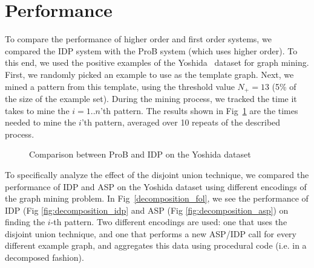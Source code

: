\section{Performance}\label{sec:performance}
To compare the performance of higher order and first order systems, we compared the IDP system with the ProB system (which uses higher order).
To this end, we used the positive examples of the Yoshida~\citep{yoshida_dataset} dataset for graph mining.
First, we randomly picked an example to use as the template graph.
Next, we mined a pattern from this template, using the threshold value $N_{+} = 13$ (5\% of the size of the example set).
During the mining process, we tracked the time it takes to mine the $i=1..n$'th pattern.
The results shown in Fig~\ref{fig:ProBIDPComp} are the times needed to mine the $i$'th pattern, averaged over 10 repeats of the described process.

\begin{figure}
\caption{Comparison between ProB and IDP on the Yoshida dataset\label{fig:ProBIDPComp}}
\end{figure}



To specifically analyze the effect of the disjoint union technique, we compared the performance of IDP and ASP on the Yoshida dataset using different encodings of the graph mining problem.
In Fig~\ref{decomposition_fol}, we see the performance of IDP (Fig \ref{fig:decomposition_idp} and ASP (Fig \ref{fig:decomposition_asp}) on finding the $i$-th pattern.
Two different encodings are used: one that uses the disjoint union technique, and one that performs a new ASP/IDP call for every different example graph, and aggregates this data using procedural code (i.e. in a decomposed fashion).


